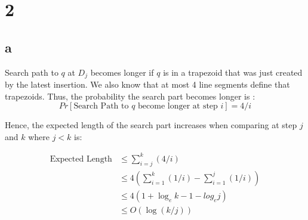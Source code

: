 
\section*{2}
\subsection*{a}
Search path to $q$ at $D_j$ becomes longer if $q$ is in a trapezoid that was just
created by the latest insertion. We also know that at most 4 line segments define
that trapezoids. Thus, the probability the search part becomes longer is :
$$
Pr[\text{Search Path to $q$ become longer at step $i$}] = 4/i
$$

Hence, the expected length of the search part increases when comparing at step $j$ and $k$
where $j<k$ is:

\begin{align*}
    \text{Expected Length} &\leq \sum_{i=j}^{k}( 4/i ) \\
    &\leq 4( \sum_{i=1}^{k}( 1/i ) -  \sum_{i=1}^{j}( 1/i ) ) \\
    &\leq 4( 1 + \log_{e}k - 1 - log_{e}j ) \\
    &\leq O(\log(k/j))
\end{align*}
